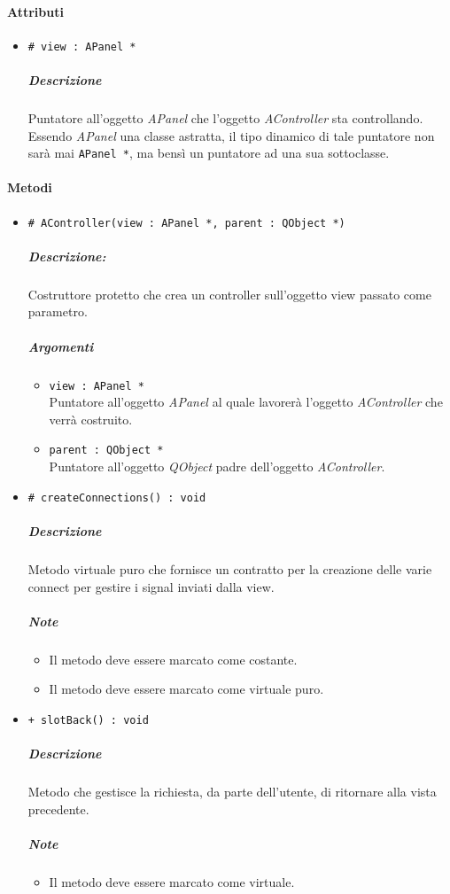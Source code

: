 	\paragraph{Attributi}
		\begin{itemize}
			\item \color{teal} \verb!# view : APanel *!
			\color{black}
			\subparagraph{Descrizione} Puntatore all'oggetto \textsl{APanel} che l'oggetto \textsl{AController} sta controllando. Essendo \textsl{APanel} una classe astratta, il tipo dinamico di tale puntatore non sarà mai \verb!APanel *!, ma bensì un puntatore ad una sua sottoclasse.
		\end{itemize}
	\paragraph{\color{black}Metodi}
		\begin{itemize}
			\item \color{blue} \verb!# AController(view : APanel *, parent : QObject *)!
			\color{black}
			\subparagraph{Descrizione:} Costruttore protetto che crea un controller sull'oggetto view passato come parametro.
			\color{black}
			\subparagraph{Argomenti}
			\begin{itemize}
				\item \color{RoyalPurple} \verb!view : APanel *!\\				
\color{black} Puntatore all'oggetto \textsl{APanel} al quale lavorerà l'oggetto \textsl{AController} che verrà costruito.
				\item \color{RoyalPurple} \verb!parent : QObject *!\\				
\color{black} Puntatore all'oggetto \textsl{QObject} padre dell'oggetto \textsl{AController}.
			\end{itemize}
			\item \color{blue} \verb!# createConnections() : void!
			\color{black}
			\subparagraph{Descrizione} Metodo virtuale puro che fornisce un contratto per la creazione delle varie connect per gestire i signal\g{} inviati dalla view.
			\subparagraph{Note}
			\begin{itemize}
				\item Il metodo deve essere marcato come costante.
				\item Il metodo deve essere marcato come virtuale puro.
			\end{itemize}
			\item \color{blue} \verb!+ slotBack() : void!
			\color{black}
			\subparagraph{Descrizione} Metodo che gestisce la richiesta, da parte dell'utente, di ritornare alla vista precedente.
			\subparagraph{Note}
			\begin{itemize}
				\item Il metodo deve essere marcato come virtuale.
			\end{itemize}
		\end{itemize}
